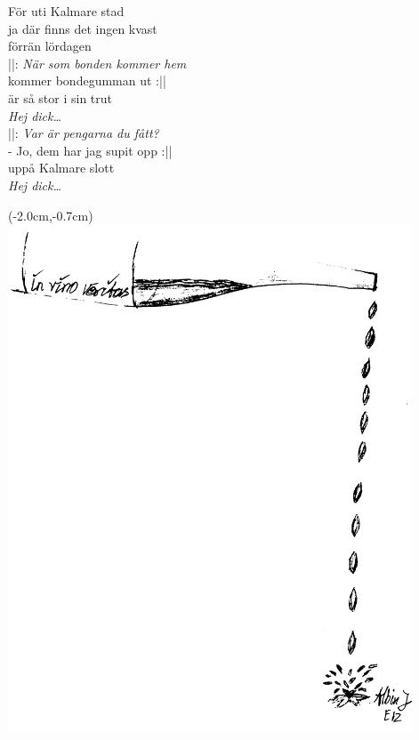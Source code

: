 \noindent För uti Kalmare stad\\
\noindent ja där finns det ingen kvast\\
\noindent förrän lördagen\\

\noindent ||: \textit{När som bonden kommer hem}\\
\noindent kommer bondegumman ut :||\\
\noindent är så stor i sin trut\\
\noindent \textit{Hej dick…}\\

\noindent ||: \textit{Var är pengarna du fått?}\\
\noindent - Jo, dem har jag supit opp :||\\
\noindent uppå Kalmare slott\\
\noindent \textit{Hej dick…}\\


\newpage
\noBackground

\begin{textblock*}{3cm}(-2.0cm,-0.7cm) %
    \includegraphics[width=12cm]{./bilder/in_vino_veritas.png}
\end{textblock*}

